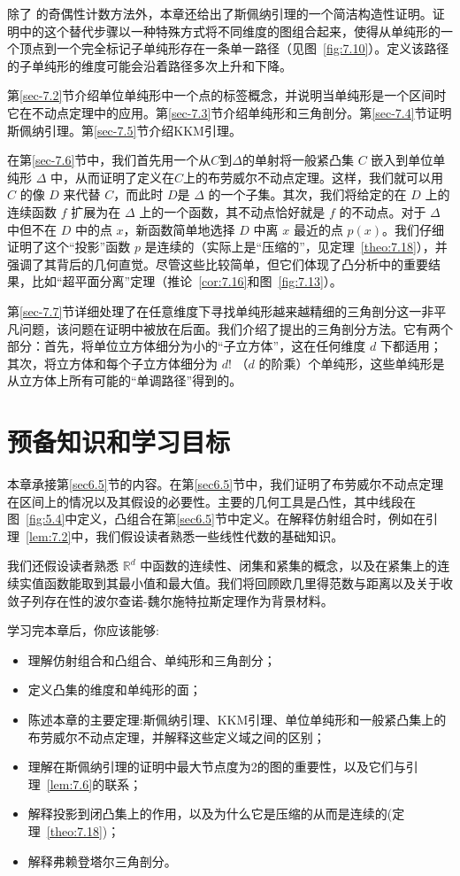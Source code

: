 除了 \citet{sperner1928} 的奇偶性计数方法外，本章还给出了斯佩纳引理的一个简洁构造性证明。证明中的这个替代步骤以一种特殊方式将不同维度的图组合起来，使得从单纯形的一个顶点到一个完全标记子单纯形存在一条单一路径（见图~\ref{fig:7.10}）。定义该路径的子单纯形的维度可能会沿着路径多次上升和下降。

第\ref{sec-7.2}节介绍单位单纯形中一个点的标签概念，并说明当单纯形是一个区间时它在不动点定理中的应用。第\ref{sec-7.3}节介绍单纯形和三角剖分。第\ref{sec-7.4}节证明斯佩纳引理。第\ref{sec-7.5}节介绍KKM引理。

在第\ref{sec-7.6}节中，我们首先用一个从\(C\)到\(\Delta\)的单射将一般紧凸集 \(C\) 嵌入到单位单纯形 \(\Delta\) 中，从而证明了定义在\(C\)上的布劳威尔不动点定理。这样，我们就可以用 \(C\) 的像 \(D\) 来代替 \(C\)，而此时 \(D\)是 \(\Delta\) 的一个子集。其次，我们将给定的在 \(D\) 上的连续函数 \(f\) 扩展为在 \(\Delta\) 上的一个函数，其不动点恰好就是 \(f\) 的不动点。对于 \(\Delta\) 中但不在 \(D\) 中的点 \(x\)，新函数简单地选择 \(D\) 中离 \(x\) 最近的点 \(p\left( x\right)\)。我们仔细证明了这个“投影”函数 \(p\) 是连续的（实际上是“压缩的”，见定理~\ref{theo:7.18}），并强调了其背后的几何直觉。尽管这些比较简单，但它们体现了凸分析中的重要结果，比如“超平面分离”定理（推论~\ref{cor:7.16}和图~\ref{fig:7.13}）。

第\ref{sec-7.7}节详细处理了在任意维度下寻找单纯形越来越精细的三角剖分这一非平凡问题，该问题在证明中被放在后面。我们介绍了\citet{freudenthal1942}提出的三角剖分方法。它有两个部分：首先，将单位立方体细分为小的“子立方体”，这在任何维度 \(d\) 下都适用；其次，将立方体和每个子立方体细分为 \(d!\)  （$d$ 的阶乘）个单纯形，这些单纯形是从立方体上所有可能的“单调路径”得到的。

\section{预备知识和学习目标}\label{sec-7.1}

本章承接第\ref{sec6.5}节的内容。在第\ref{sec6.5}节中，我们证明了布劳威尔不动点定理在区间上的情况以及其假设的必要性。主要的几何工具是凸性，其中线段在图~\ref{fig:5.4}中定义，凸组合在第\ref{sec6.5}节中定义。在解释仿射组合时，例如在引理~\ref{lem:7.2}中，我们假设读者熟悉一些线性代数的基础知识。

我们还假设读者熟悉 \({\mathbb{R}}^{d}\) 中函数的连续性、闭集和紧集的概念，以及在紧集上的连续实值函数能取到其最小值和最大值。我们将回顾欧几里得范数与距离以及关于收敛子列存在性的波尔查诺-魏尔施特拉斯定理作为背景材料。

学习完本章后，你应该能够:
\begin{itemize}
\item 理解仿射组合和凸组合、单纯形和三角剖分；
\item 定义凸集的维度和单纯形的面；
\item 陈述本章的主要定理:斯佩纳引理、KKM引理、单位单纯形和一般紧凸集上的布劳威尔不动点定理，并解释这些定义域之间的区别；
\item 理解在斯佩纳引理的证明中最大节点度为2的图的重要性，以及它们与引理~\ref{lem:7.6}的联系；
\item 解释投影到闭凸集上的作用，以及为什么它是压缩的从而是连续的(定理~\ref{theo:7.18})；
\item 解释弗赖登塔尔三角剖分。
\end{itemize}

